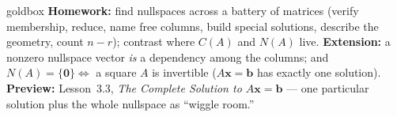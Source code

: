 \documentclass[10pt]{article}
\newcommand{\xx}{\mathbf{x}}
\newcommand{\bb}{\mathbf{b}}
\newcommand{\zero}{\mathbf{0}}
\begin{document}
\begin{skillbox}{goldbox}
\textbf{Homework:} find nullspaces across a battery of matrices (verify membership, reduce, name
free columns, build special solutions, describe the geometry, count $n-r$); contrast where $C(A)$ and
$N(A)$ live. \textbf{Extension:} a nonzero nullspace vector \emph{is} a dependency among the columns;
and $N(A)=\{\zero\}\Leftrightarrow$ a square $A$ is invertible ($A\xx=\bb$ has exactly one solution).
\textbf{Preview:} Lesson~3.3, \emph{The Complete Solution to $A\xx=\bb$} --- one particular solution
plus the whole nullspace as ``wiggle room.''
\end{skillbox}
\end{document}
